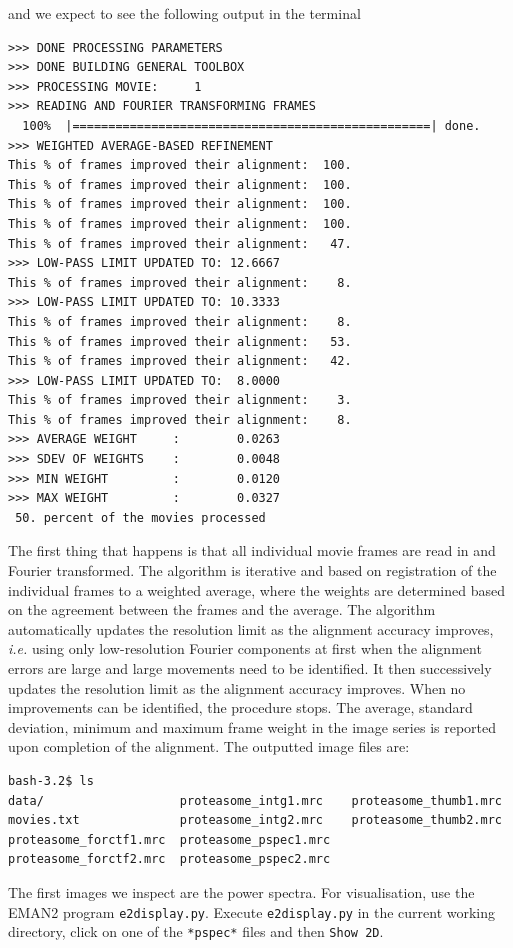 \documentclass[a4paper,11pt]{article}
\begin{document}
and we expect to see the following output in the terminal
\begin{verbatim}
>>> DONE PROCESSING PARAMETERS
>>> DONE BUILDING GENERAL TOOLBOX
>>> PROCESSING MOVIE:     1
>>> READING AND FOURIER TRANSFORMING FRAMES
  100%  |==================================================| done.
>>> WEIGHTED AVERAGE-BASED REFINEMENT
This % of frames improved their alignment:  100.
This % of frames improved their alignment:  100.
This % of frames improved their alignment:  100.
This % of frames improved their alignment:  100.
This % of frames improved their alignment:   47.
>>> LOW-PASS LIMIT UPDATED TO: 12.6667
This % of frames improved their alignment:    8.
>>> LOW-PASS LIMIT UPDATED TO: 10.3333
This % of frames improved their alignment:    8.
This % of frames improved their alignment:   53.
This % of frames improved their alignment:   42.
>>> LOW-PASS LIMIT UPDATED TO:  8.0000
This % of frames improved their alignment:    3.
This % of frames improved their alignment:    8.
>>> AVERAGE WEIGHT     :        0.0263
>>> SDEV OF WEIGHTS    :        0.0048
>>> MIN WEIGHT         :        0.0120
>>> MAX WEIGHT         :        0.0327
 50. percent of the movies processed
\end{verbatim}
The first thing that happens is that all individual movie frames are read in and Fourier transformed. The algorithm is iterative and based on registration of the individual frames to a weighted average, where the weights are determined based on the agreement between the frames and the average. The algorithm automatically updates the resolution limit as the alignment accuracy improves, \textit{i.e.} using only low-resolution Fourier components at first when the alignment errors are large and large movements need to be identified. It then successively updates the resolution limit as the alignment accuracy improves. When no improvements can be identified, the procedure stops. The average, standard deviation, minimum and maximum frame weight in the image series is reported upon completion of the alignment. The outputted image files are:
\begin{verbatim}
bash-3.2$ ls
data/                   proteasome_intg1.mrc    proteasome_thumb1.mrc
movies.txt              proteasome_intg2.mrc    proteasome_thumb2.mrc
proteasome_forctf1.mrc  proteasome_pspec1.mrc
proteasome_forctf2.mrc  proteasome_pspec2.mrc
\end{verbatim}
The first images we inspect are the power spectra. For visualisation, use the EMAN2 program \texttt{e2display.py}. Execute \texttt{e2display.py} in the current working directory, click on one of the \texttt{*pspec*} files and then \texttt{Show 2D}.
\end{document}
